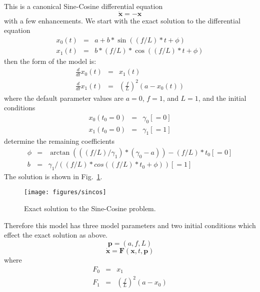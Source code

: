 This is a canonical Sine-Cosine differential equation
\[
\mathbf{\ddot{x}}=-\mathbf{x}
\]
with a few enhancements. We start with the exact solution to the differential
equation 
\begin{eqnarray*}
x_{0}(t) & = & a+b*\sin((f/L)*t+\phi)\\
x_{1}(t) & = & b*(f/L)*\cos((f/L)*t+\phi)
\end{eqnarray*}
then the form of the model is: 
\begin{eqnarray*}
\frac{d}{dt}x_{0}(t) & = & x_{1}(t)\\
\frac{d}{dt}x_{1}(t) & = & \left(\frac{f}{L}\right)^{2}(a-x_{0}(t))
\end{eqnarray*}
where the default parameter values are $a=0$, $f=1$, and $L=1$,
and the initial conditions
\begin{eqnarray*}
x_{0}(t_{0}=0) & = & \gamma_{0}[=0]\\
x_{1}(t_{0}=0) & = & \gamma_{1}[=1]
\end{eqnarray*}
determine the remaining coefficients
\begin{eqnarray*}
\phi & = & \arctan(((f/L)/\gamma_{1})*(\gamma_{0}-a))-(f/L)*t_{0}[=0]\\
b & = & \gamma_{1}/((f/L)*cos((f/L)*t_{0}+\phi))[=1]
\end{eqnarray*}
The solution is shown in Fig.~\ref{rythmos:fig:SinCos-exact}. 
\begin{figure}

\begin{centering}
\texttt{[image: figures/sincos]}\caption{Exact solution to the Sine-Cosine problem.\label{rythmos:fig:SinCos-exact}}
\par\end{centering}
\end{figure}
Therefore this model has three model parameters and two initial conditions
which effect the exact solution as above. 
\[
\mathbf{p}=(a,f,L)
\]
\[
\dot{\mathbf{x}}=\mathbf{F}(\mathbf{x},t,\mathbf{p})
\]
where
\begin{eqnarray*}
F_{0} & = & x_{1}\\
F_{1} & = & \left(\frac{f}{L}\right)^{2}(a-x_{0})
\end{eqnarray*}


